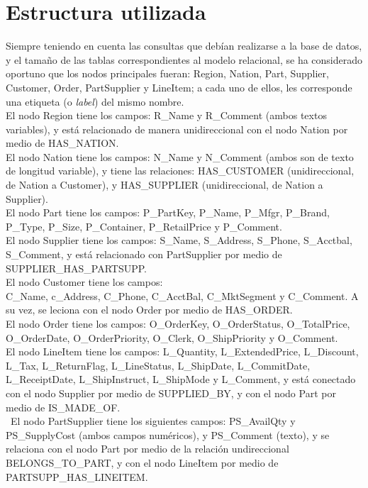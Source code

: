 \documentclass[10pt,journal,compsoc]{IEEEtran}
\begin{document}
\section{Estructura utilizada}
Siempre teniendo en cuenta las consultas que deb\'ian realizarse a la base de datos, y el tama\~no de  las tablas correspondientes al modelo relacional, se ha considerado oportuno que los nodos principales fueran: Region, Nation, Part, Supplier, Customer, Order, PartSupplier y LineItem; a cada uno de ellos, les corresponde una etiqueta (o \textit{label}) del mismo nombre.\\
El nodo Region tiene los campos: R\_Name y R\_Comment (ambos textos variables), y est\'a relacionado de manera unidireccional con el nodo Nation por medio de HAS\_NATION.\\
El nodo Nation tiene los campos: N\_Name y N\_Comment (ambos son de texto de longitud variable), y tiene las relaciones: HAS\_CUSTOMER (unidireccional, de Nation a Customer), y HAS\_SUPPLIER (unidireccional, de Nation a Supplier).\\
El nodo Part tiene los campos: P\_PartKey, P\_Name, P\_Mfgr, P\_Brand, P\_Type, P\_Size, P\_Container, P\_RetailPrice y P\_Comment. \\
El nodo Supplier tiene los campos: S\_Name, S\_Address, S\_Phone, S\_Acctbal, S\_Comment, y est\'a relacionado con PartSupplier por medio de SUPPLIER\_HAS\_PARTSUPP. \\
El nodo Customer tiene los campos: \\ C\_Name, c\_Address, C\_Phone, C\_AcctBal, C\_MktSegment y C\_Comment. A su vez, se leciona con el nodo Order por medio de HAS\_ORDER. \\
El nodo Order tiene los campos: O\_OrderKey, O\_OrderStatus, O\_TotalPrice, O\_OrderDate, O\_OrderPriority, O\_Clerk,  O\_ShipPriority y O\_Comment. \\
El nodo LineItem  tiene los campos: L\_Quantity, L\_ExtendedPrice, L\_Discount, L\_Tax, L\_ReturnFlag, L\_LineStatus, L\_ShipDate, L\_CommitDate, L\_ReceiptDate, L\_ShipInstruct, L\_ShipMode y L\_Comment, y est\'a conectado con el nodo Supplier por medio de SUPPLIED\_BY, y con el nodo Part por medio de IS\_MADE\_OF.\\\
El nodo PartSupplier tiene los siguientes campos: PS\_AvailQty y PS\_SupplyCost (ambos campos num\'ericos), y PS\_Comment (texto), y se relaciona con el nodo Part por medio de la relaci\'on undireccional BELONGS\_TO\_PART, y con el nodo LineItem por medio de PARTSUPP\_HAS\_LINEITEM.\\
\end{document}
